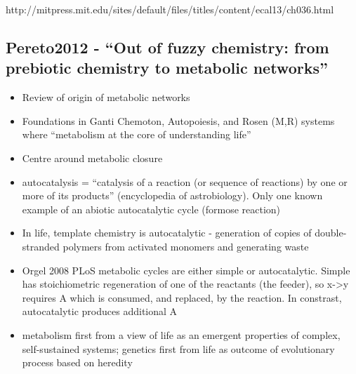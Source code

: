 		http://mitpress.mit.edu/sites/default/files/titles/content/ecal13/ch036.html
		
		\hypertarget{pereto2012---out-of-fuzzy-chemistry-from-prebiotic-chemistry-to-metabolic-networks}{\subsection{Pereto2012
				- ``Out of fuzzy chemistry: from prebiotic chemistry to metabolic
				networks''}\label{pereto2012---out-of-fuzzy-chemistry-from-prebiotic-chemistry-to-metabolic-networks}}
		
		\begin{itemize}
			\item
			
			Review of origin of metabolic networks
			
			\item
			
			Foundations in Ganti Chemoton, Autopoiesis, and Rosen (M,R) systems
			where ``metabolism at the core of understanding life''
			
			\item
			
			Centre around metabolic closure
			
			\item
			
			autocatalysis = ``catalysis of a reaction (or sequence of reactions)
			by one or more of its products'' (encyclopedia of astrobiology). Only
			one known example of an abiotic autocatalytic cycle (formose reaction)
			
			\item
			
			In life, template chemistry is autocatalytic - generation of copies of
			double-stranded polymers from activated monomers and generating waste
			
			\item
			
			Orgel 2008 PLoS metabolic cycles are either simple or autocatalytic.
			Simple has stoichiometric regeneration of one of the reactants (the
			feeder), so x-\textgreater{}y requires A which is consumed, and
			replaced, by the reaction. In constrast, autocatalytic produces
			additional A
			
			\item
			
			metabolism first from a view of life as an emergent properties of
			complex, self-sustained systems; genetics first from life as outcome
			of evolutionary process based on heredity
			

\end{itemize}
